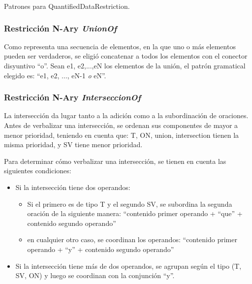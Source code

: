 \begin{GrammarEnv}
\begin{grammar}
\end{grammar}
\caption{Patrones para QuantifiedDataRestriction.}\label{gram:quant_data_rest}
\end{GrammarEnv}

\subsubsection{Restricción N-Ary \emph{UnionOf}} 
Como representa una secuencia de elementos, en la que uno o más elementos pueden ser verdaderos, se eligió concatenar a todos los elementos con el conector disyuntivo ``o''. Sean e1, e2,...,eN los elementos de la unión, el patrón gramatical elegido es: ``e1, e2, ..., eN-1 \emph{o} eN''.

\subsubsection{Restricción N-Ary \emph{InterseccionOf}}
La intersección da lugar tanto a la adición como a la subordinación de oraciones. Antes de verbalizar una intersección, se ordenan sus componentes de mayor a menor prioridad, teniendo en cuenta que: T, ON, union, intersection tienen la misma prioridad, y SV tiene menor prioridad. 

Para determinar cómo verbalizar una intersección, se tienen en cuenta las siguientes condiciones:
\begin{itemize}
    \item Si la intersección tiene dos operandos:
        \begin{itemize}
            \item Si el primero es de tipo T  y el segundo SV, se subordina la segunda oración de la siguiente manera:
            ``contenido primer operando + ``que'' + contenido segundo operando''
            \item en cualquier otro caso, se coordinan los operandos:
            ``contenido primer operando + ``y'' + contenido segundo operando''
        \end{itemize}
        \item Si la intersección tiene más de dos operandos, se agrupan según el tipo  (T, SV, ON) y luego se coordinan con la conjunción ``y''.
\end{itemize}

